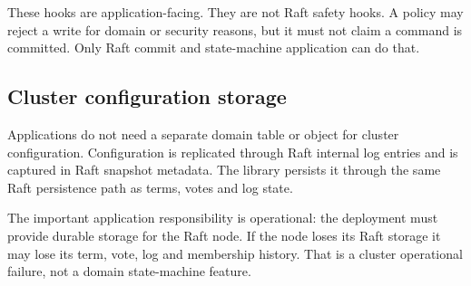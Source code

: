 These hooks are application-facing. They are not Raft safety hooks. A policy may
reject a write for domain or security reasons, but it must not claim a command is
committed. Only Raft commit and state-machine application can do that.

\subsection{Cluster configuration storage}

Applications do not need a separate domain table or object for cluster
configuration. Configuration is replicated through Raft internal log entries and
is captured in Raft snapshot metadata. The library persists it through the same
Raft persistence path as terms, votes and log state.

The important application responsibility is operational: the deployment must
provide durable storage for the Raft node. If the node loses its Raft storage it
may lose its term, vote, log and membership history. That is a cluster
operational failure, not a domain state-machine feature.
